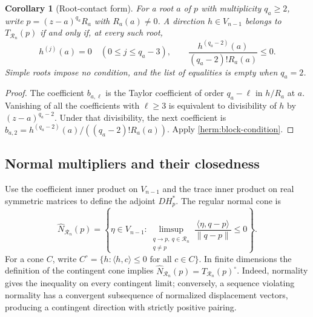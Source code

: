 \documentclass[reqno]{amsart}
\newtheorem{corollary}[theorem]{Corollary}
\theoremstyle{definition}
\theoremstyle{remark}
\begin{document}
\begin{corollary}[Root-contact form]
\label{herm:root-contact}
For a root $a$ of $p$ with multiplicity $q_a\geq2$, write
$p=(z-a)^{q_a}R_a$ with $R_a(a)\ne0$.  A direction $h\in V_{n-1}$
belongs to $T_{\mathcal R_n}(p)$ if and only if, at every such root,
\begin{equation}
 h^{(j)}(a)=0\quad(0\leq j\leq q_a-3),
 \qquad
 \frac{h^{(q_a-2)}(a)}{(q_a-2)!R_a(a)}\leq0.
 \label{herm:root-contact-formula}
\end{equation}
Simple roots impose no condition, and the list of equalities is empty
when $q_a=2$.
\end{corollary}

\begin{proof}
The coefficient $b_{a,\ell}$ is the Taylor coefficient of order
$q_a-\ell$ in $h/R_a$ at $a$.  Vanishing of all the coefficients with
$\ell\geq3$ is equivalent to divisibility of $h$ by $(z-a)^{q_a-2}$.
Under that divisibility, the next coefficient is
$b_{a,2}=h^{(q_a-2)}(a)/((q_a-2)!R_a(a))$.
Apply \eqref{herm:block-condition}.
\end{proof}

\subsection{Normal multipliers and their closedness}

Use the coefficient inner product on $V_{n-1}$ and the trace inner
product on real symmetric matrices to define the adjoint $DH_p^*$.
The regular normal cone is
\[
 \widehat N_{\mathcal R_n}(p)=
 \left\{\eta\in V_{n-1}:
 \limsup_{\substack{q\to p,\ q\in\mathcal R_n\\q\ne p}}
       \frac{\langle\eta,q-p\rangle}{\|q-p\|}\leq0\right\}.
\]
For a cone $C$, write
$C^\circ=\{h:\langle h,c\rangle\leq0\text{ for all }c\in C\}$.
In finite dimensions the definition of the contingent cone implies
$\widehat N_{\mathcal R_n}(p)=T_{\mathcal R_n}(p)^\circ$.
Indeed, normality gives the inequality on every contingent limit;
conversely, a sequence violating normality has a convergent subsequence
of normalized displacement vectors, producing a contingent direction
with strictly positive pairing.
\end{document}
